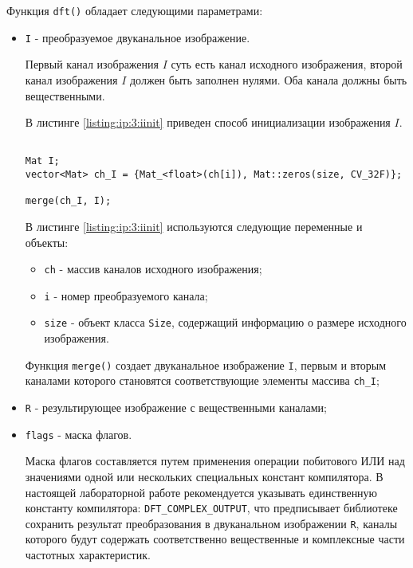 Функция \verb|dft()| обладает следующими параметрами:

\begin{itemize}

	\item \verb|I| - преобразуемое двуканальное изображение.

	Первый канал изображения $I$ суть есть канал исходного изображения, второй канал изображения $I$ должен быть заполнен нулями. Оба канала должны быть вещественными.

	В листинге \ref{listing:ip:3:iinit} приведен способ инициализации изображения $I$.

\begin{lstlisting}

Mat I;
vector<Mat> ch_I = {Mat_<float>(ch[i]), Mat::zeros(size, CV_32F)};

merge(ch_I, I);

\end{lstlisting}
\mylistingend

	В листинге \ref{listing:ip:3:iinit} используются следующие переменные и объекты:

	\begin{itemize}

		\item \verb|ch| - массив каналов исходного изображения;
		\item \verb|i| - номер преобразуемого канала;
		\item \verb|size| - объект класса \verb|Size|, содержащий информацию о размере исходного изображения.

	\end{itemize}

	Функция \verb|merge()| создает двуканальное изображение \verb|I|, первым и вторым каналами которого становятся соответствующие элементы массива \verb|ch_I|;

	\item \verb|R| - результирующее изображение с вещественными каналами;

	\item \verb|flags| - маска флагов.

	Маска флагов составляется путем применения операции побитового ИЛИ над значениями одной или нескольких специальных констант компилятора. В настоящей лабораторной работе рекомендуется указывать единственную константу компилятора: \linebreak \verb|DFT_COMPLEX_OUTPUT|, что предписывает библиотеке сохранить результат преобразования в двуканальном изображении \verb|R|, каналы которого будут содержать соответственно вещественные и комплексные части частотных характеристик.

\end{itemize}

